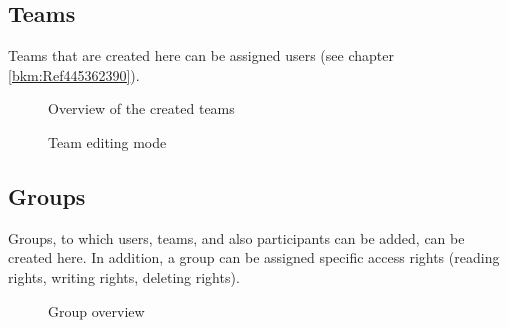\raggedright{}

\clearpage
\subsection{Teams}

Teams that are created here can be assigned users (see chapter \ref{bkm:Ref445362390}).

\begin{figure}[H]
\caption{Overview of the created teams}
\end{figure}

\begin{figure}[H]
\caption{Team editing mode}
\end{figure}

\clearpage
\subsection{Groups}

Groups, to which users, teams, and also participants can be added, can be created here. In addition, a group can be assigned specific access rights (reading rights, writing rights, deleting rights).

\begin{figure}[H]
\caption{Group overview}
\end{figure}

